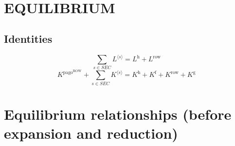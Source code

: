 \section{EQUILIBRIUM}

\subsection{Identities}

\begin{equation}
\sum_{s\in {S\!E\!C}} {L}^{\langle s\rangle} = L^{\mathrm{h}} + L^{\mathrm{row}}
\end{equation}
\begin{equation}
K^{\mathrm{pago}^{\mathrm{ROW}}} + \sum_{s\in {S\!E\!C}} {K}^{\langle s\rangle} = K^{\mathrm{h}} + K^{\mathrm{f}} + K^{\mathrm{row}} + K^{\mathrm{g}}
\end{equation}




\section{Equilibrium relationships (before expansion and reduction)}

